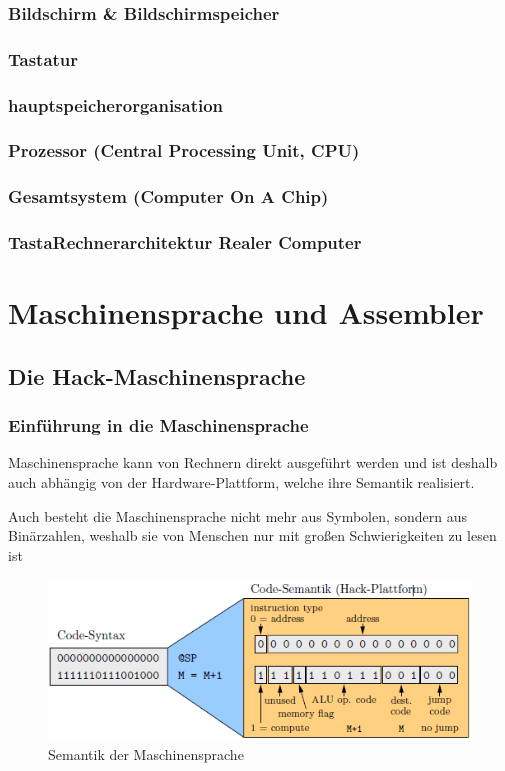 \documentclass[12pt]{report}
\begin{document}
\subsection{Bildschirm \& Bildschirmspeicher}
\subsection{Tastatur}
\subsection{hauptspeicherorganisation}
\subsection{Prozessor (Central Processing Unit, CPU)}
\subsection{Gesamtsystem (Computer On A Chip)}
\subsection{TastaRechnerarchitektur Realer Computer}



\chapter{Maschinensprache und Assembler}

\section{Die Hack-Maschinensprache}
\subsection{Einführung in die Maschinensprache}
\begin{defbox}[Maschinensprache]
  Maschinensprache kann von Rechnern direkt ausgeführt werden und ist deshalb auch abhängig von der
  Hardware-Plattform, welche ihre Semantik realisiert.

  Auch besteht die Maschinensprache nicht mehr aus Symbolen, sondern aus Binärzahlen, weshalb sie von Menschen
  nur mit großen Schwierigkeiten zu lesen ist
\end{defbox}
\begin{figure}[H]
  \caption{Semantik der Maschinensprache}
  \label{fig:semantik_maschinensprache}
  \centering
  \includegraphics{semantik_maschinensprache}
\end{figure}
\end{document}
